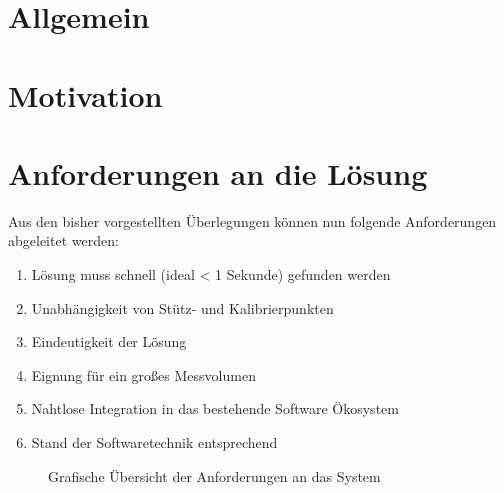 %
\section[Allgemein]{Allgemein}

%
%
\section[Motivation]{Motivation}

%
%
\section[Anforderungen]{Anforderungen an die Lösung}
%
Aus den bisher vorgestellten Überlegungen können nun folgende Anforderungen abgeleitet werden:
%
\begin{enumerate}[itemsep=0mm]
	\item Lösung muss schnell (ideal < 1 Sekunde) gefunden werden
	\item Unabhängigkeit von Stütz- und Kalibrierpunkten
	\item Eindeutigkeit der Lösung
	\item Eignung für ein großes Messvolumen
	\item Nahtlose Integration in das bestehende Software Ökosystem
	\item Stand der Softwaretechnik entsprechend
%
\end{enumerate}
%
\begin{figure}[ht!]
         \centering
         
         \caption[Anforderungsspinne]{ Grafische Übersicht der Anforderungen an das System }
         \label{fig:Requirements}
\end{figure}
%
%
